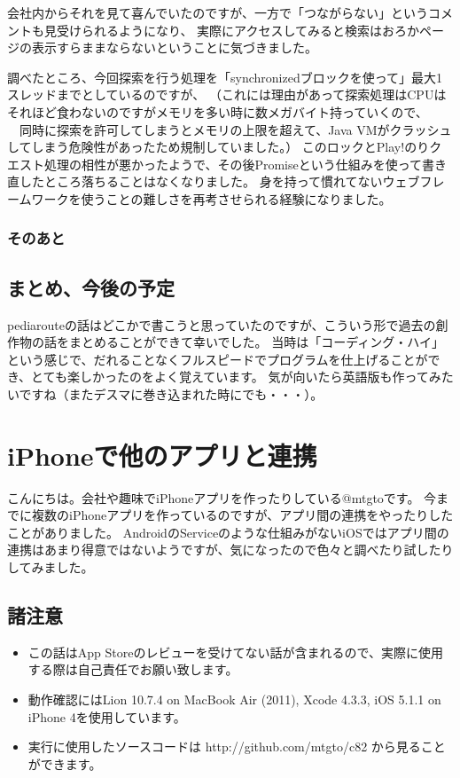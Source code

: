 \documentclass[b5paper]{jsarticle}
\begin{document}
会社内からそれを見て喜んでいたのですが、一方で「つながらない」というコメントも見受けられるようになり、
実際にアクセスしてみると検索はおろかページの表示すらままならないということに気づきました。

調べたところ、今回探索を行う処理を「synchronizedブロックを使って」最大1スレッドまでとしているのですが、
（これには理由があって探索処理はCPUはそれほど食わないのですがメモリを多い時に数メガバイト持っていくので、
　同時に探索を許可してしまうとメモリの上限を超えて、Java VMがクラッシュしてしまう危険性があったため規制していました。）
このロックとPlay!のりクエスト処理の相性が悪かったようで、その後Promiseという仕組みを使って書き直したところ落ちることはなくなりました。
身を持って慣れてないウェブフレームワークを使うことの難しさを再考させられる経験になりました。

\subsubsection{そのあと}


\subsection{まとめ、今後の予定}
pediarouteの話はどこかで書こうと思っていたのですが、こういう形で過去の創作物の話をまとめることができて幸いでした。
当時は「コーディング・ハイ」という感じで、だれることなくフルスピードでプログラムを仕上げることができ、とても楽しかったのをよく覚えています。
気が向いたら英語版も作ってみたいですね（またデスマに巻き込まれた時にでも・・・）。

\section{iPhoneで他のアプリと連携}
こんにちは。会社や趣味でiPhoneアプリを作ったりしている@mtgtoです。
今までに複数のiPhoneアプリを作っているのですが、アプリ間の連携をやったりしたことがありました。
AndroidのServiceのような仕組みがないiOSではアプリ間の連携はあまり得意ではないようですが、気になったので色々と調べたり試したりしてみました。

\subsection{諸注意}
\begin{itemize}
  \item この話はApp Storeのレビューを受けてない話が含まれるので、実際に使用する際は自己責任でお願い致します。
  \item 動作確認にはLion 10.7.4 on MacBook Air (2011), Xcode 4.3.3, iOS 5.1.1 on iPhone 4を使用しています。
  \item 実行に使用したソースコードは http://github.com/mtgto/c82 から見ることができます。
\end{itemize}
\end{document}

